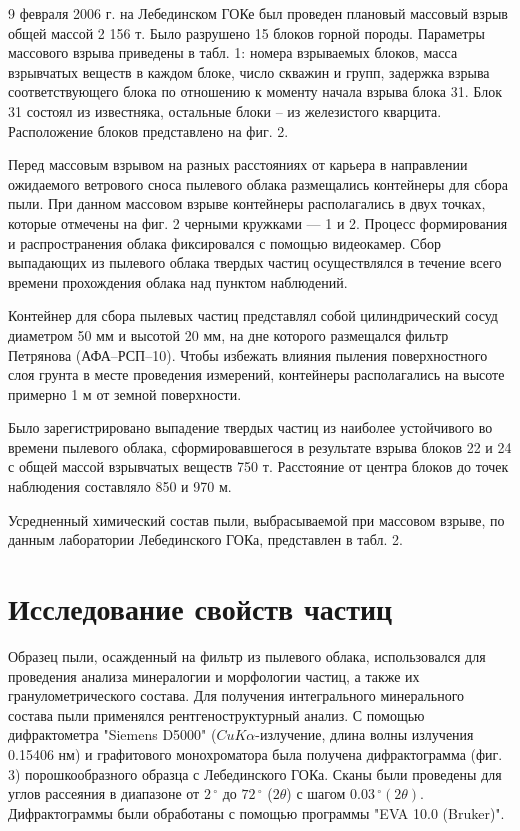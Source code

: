 9 февраля 2006 г. на Лебединском ГОКе был проведен плановый массовый взрыв общей массой 2 156 т. Было разрушено 15 блоков горной породы. Параметры массового взрыва приведены в табл. 1: номера взрываемых блоков, масса взрывчатых веществ в каждом блоке, число скважин и групп, задержка взрыва соответствующего блока по отношению к моменту начала взрыва блока 31. Блок 31 состоял из известняка, остальные блоки – из железистого кварцита. Расположение блоков представлено на фиг. 2.

Перед массовым взрывом на разных расстояниях от карьера в направлении ожидаемого ветрового сноса пылевого облака размещались контейнеры для сбора пыли. При данном массовом взрыве контейнеры располагались в двух точках, которые отмечены на фиг. 2 черными кружками — 1 и 2. Процесс формирования и распространения облака фиксировался с помощью видеокамер. Сбор выпадающих из пылевого облака твердых частиц осуществлялся в течение всего времени прохождения облака над пунктом наблюдений.

Контейнер для сбора пылевых частиц  представлял собой цилиндрический сосуд диаметром 50 мм и высотой 20 мм, на дне которого размещался фильтр Петрянова (АФА–РСП–10). Чтобы избежать влияния пыления поверхностного слоя грунта в месте проведения измерений, контейнеры располагались на высоте примерно 1 м от земной поверхности.

Было зарегистрировано выпадение твердых частиц из наиболее устойчивого во времени пылевого облака, сформировавшегося в результате взрыва блоков 22 и 24 с общей массой взрывчатых веществ 750 т. Расстояние от центра блоков до точек наблюдения составляло 850 и 970 м.

Усредненный химический состав пыли, выбрасываемой при массовом взрыве, по данным лаборатории Лебединского ГОКа, представлен в табл. 2.


\section{Исследование свойств частиц} \label{sect2_3}

Образец пыли, осажденный на фильтр из пылевого облака, использовался для проведения анализа минералогии и морфологии частиц, а также их гранулометрического состава. Для получения интегрального минерального состава пыли применялся рентгеноструктурный анализ. С помощью дифрактометра "Siemens D5000" ($CuK\alpha$-излучение, длина волны излучения 0.15406 нм) и графитового монохроматора была получена дифрактограмма (фиг. 3) порошкообразного образца с Лебединского ГОКа. Сканы были проведены для углов рассеяния в диапазоне от $2\,^{\circ}$ до $72\,^{\circ}$ ($2\theta$) с шагом $0.03\,^{\circ}(2\theta)$. Дифрактограммы были обработаны с помощью программы "EVA 10.0 (Bruker)".

